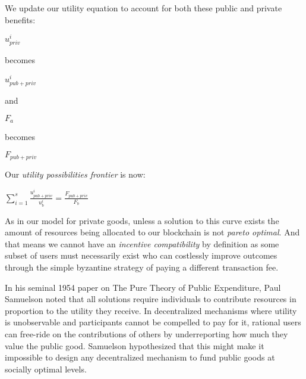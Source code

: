 \documentclass[oneside]{article}   	%
\begin{document}
We update our utility equation to account for both these public and private benefits:

\large
\begin{adjustwidth}{1.5em}{1.5em} 
\begin{math}
{u_{priv}^i}
\end{math}
\end{adjustwidth}
\normalsize

becomes

\large
\begin{adjustwidth}{1.5em}{1.5em} 
\begin{math}
{u_{{pub}+{priv}}^i}
\end{math}
\end{adjustwidth}
\normalsize

and

\large
\begin{adjustwidth}{1.5em}{1.5em} 
\begin{math}
{F_a}
\end{math}
\end{adjustwidth}
\normalsize

becomes

\large
\begin{adjustwidth}{1.5em}{1.5em} 
\begin{math}
{F_{{pub}+{priv}}}
\end{math}
\end{adjustwidth}
\normalsize

Our \textit{utility possibilities frontier} is now:

\LARGE
\begin{adjustwidth}{1.5em}{1.5em} 
\begin{math}
\sum_{i=1}^{s} \frac{u_{{pub}+{priv}}^i}{u_b^i} = \frac{F_{{pub}+{priv}}}{F_b}
\end{math}
\end{adjustwidth}
\normalsize

As in our model for private goods, unless a solution to this curve exists the amount of resources being allocated to our blockchain is not \textit{pareto optimal}. And that means we cannot have an \textit{incentive compatibility} by definition as some subset of users must necessarily exist who can costlessly improve outcomes through the simple byzantine strategy of paying a different transaction fee.

In his seminal 1954 paper on The Pure Theory of Public Expenditure, Paul Samuelson noted that all solutions require individuals to contribute resources in proportion to the utility they receive. In decentralized mechanisms where utility is unobservable and participants cannot be compelled to pay for it, rational users can free-ride on the contributions of others by underreporting how much they value the public good. Samuelson hypothesized that this might make it impossible to design any decentralized mechanism to fund public goods at socially optimal levels.
\end{document}
